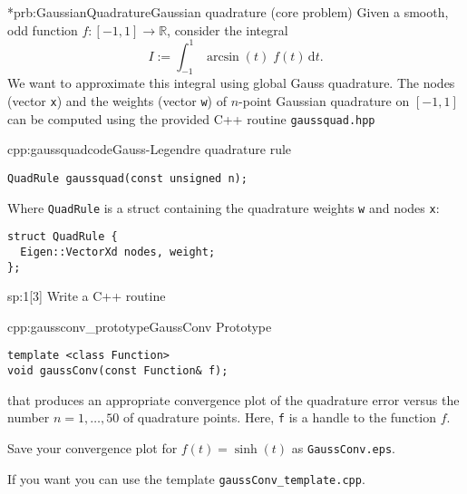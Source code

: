 
\begin{samproblem}*{prb:GaussianQuadrature}{Gaussian quadrature (core problem)}{
  Given a smooth, odd function $f:[-1,1]\rightarrow \mathbb{R}$, consider the integral
  \begin{equation}
  \label{eq:GaussianQuadrature_IntArcsin}
    I := \int_{-1}^{1} \arcsin(t) \; f(t) \,\mathrm{d}t.
  \end{equation}
  We want to approximate this integral using global Gauss quadrature.
  The nodes (vector \texttt{x}) and the weights (vector \texttt{w}) of $n$-point Gaussian quadrature on $[-1,1]$ 
  can be computed using the provided C++ routine \texttt{gaussquad.hpp}
}

\begin{samcode}[C++-code]{cpp:gaussquadcode}{Gauss-Legendre quadrature rule}
  \begin{lstlisting}[style=cpp]
QuadRule gaussquad(const unsigned n);
  \end{lstlisting}
  Where \texttt{QuadRule} is a struct containing the quadrature weights \texttt{w} and nodes \texttt{x}:
  \begin{lstlisting}[style=cpp]
struct QuadRule {
  Eigen::VectorXd nodes, weight;
};
  \end{lstlisting}
\end{samcode}


\begin{subproblem}{sp:1}[3]
  Write a C++ routine
  \begin{samcode}[C++-code]{cpp:gaussconv_prototype}{GaussConv Prototype}
    \begin{lstlisting}[style=cpp]
template <class Function>
void gaussConv(const Function& f);
    \end{lstlisting}
  \end{samcode}
  that produces an appropriate convergence plot of the quadrature error versus the
  number $n=1,\ldots,50$ of quadrature points. Here, \texttt{f} is a handle to the function $f$.

  Save your convergence plot for $f(t)=\sinh(t)$ as \texttt{GaussConv.eps}.
  
  \begin{samhint}
    If you want you can use the template \texttt{gaussConv_template.cpp}. 
  \end{samhint}


\end{subproblem}
\end{samproblem}

